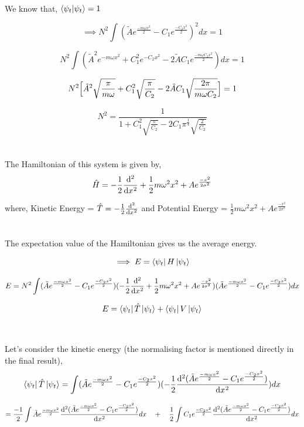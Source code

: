 \documentclass[12pt]{article}
\begin{document}
\noindent
\\
We know that, $\braket{\psi_t|\psi_t} = 1$

 \[ \implies N^2 \int (\tilde{A}e^{\frac{-m \omega x^2}{2}} - C_1e^{\frac{-C_2 x^2}{2}})^2 dx = 1\]


\[ N^2 \int(\tilde{A}^2 e^{-m \omega x^2} + C_1^2 e^{-C_2 x^2} - 2\tilde{A}C_1 e^{\frac{-m \omega C_2 x^2}{2}})dx = 1\]

\[ N^2 \Big[\tilde{A}^2 \sqrt{\frac{\pi}{m \omega}} + C_1^2 \sqrt{\frac{\pi}{C_2}} - 2 \Tilde{A} C_1 \sqrt{{\frac{2 \pi}{m \omega C_2}}} \Big] = 1 \]

\begin{equation}
N^2 = \frac{1}{1 + C_1^2 \sqrt{\frac{\pi}{C_2}} - 2C_1 \pi^\frac{1}{4} \sqrt{\frac{2}{C_2}}} 
\end{equation}
\\
\\
The Hamiltonian of this system is given by, 
\[\hat{H} = -\frac{1}{2}\diff[2]{}{x} + \frac{1}{2}m\omega^2 x^{2} + A e^{\frac{-x^2}{2\sigma^2}}\]

where, Kinetic Energy = $\hat{T} =  -\frac{1}{2}\diff[2]{}{x}$ and Potential Energy = $\frac{1}{2}m\omega^2 x^{2} + A e^{\frac{-x^2}{2\sigma^2}}$
\\
\\
\\
The expectation value of the Hamiltonian gives us the average energy.

\[ \implies E = \bra{\psi_t}H\ket{\psi_t}\] 

\[E = N^2 \int (\tilde{A}e^{\frac{-m \omega x^2}{2}} - C_1e^{\frac{-C_2 x^2}{2}})( -\frac{1}{2}\diff[2]{}{x} + 
\frac{1}{2}m\omega^2 x^{2} + A e^{\frac{-x^2}{2\sigma^2}}) (\tilde{A}e^{\frac{-m \omega x^2}{2}} - C_1e^{\frac{-C_2 x^2}{2}}) dx\]

\[ E = \bra{\psi_t}\hat{T}\ket{\psi_t} + \bra{\psi_t}V\ket{\psi_t}\]
\\
\\
Let's consider the kinetic energy (the normalising factor is mentioned directly in the final result),
\[\bra{\psi_t}\hat{T}\ket{\psi_t} = \int(\tilde{A}e^{\frac{-m \omega x^2}{2}} - C_1e^{\frac{-C_2 x^2}{2}}) 
( -\frac{1}{2}\diff[2]{(\tilde{A}e^{\frac{-m \omega x^2}{2}} - C_1e^{\frac{-C_2 x^2}{2}})}{x}) dx \]

\[ = \frac{-1}{2} \int \tilde{A}e^{\frac{-m \omega x^2}{2}} \diff[2]{(\tilde{A}e^{\frac{-m \omega x^2}{2}} - C_1e^{\frac{-C_2 x^2}{2}})}{x} dx 
\quad + \quad \frac{1}{2} \int C_1e^{\frac{-C_2 x^2}{2}} \diff[2]{(\tilde{A}e^{\frac{-m \omega x^2}{2}} - C_1e^{\frac{-C_2 x^2}{2}})}{x} dx \]
\end{document}
